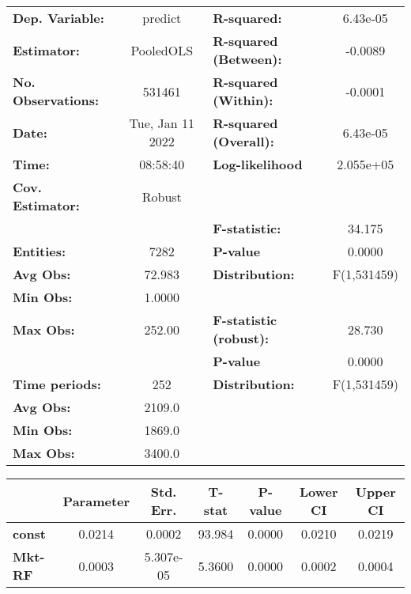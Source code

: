 \begin{center}
\begin{tabular}{lclc}
\toprule
\textbf{Dep. Variable:}    &      predict       & \textbf{  R-squared:         }   &     6.43e-05     \\
\textbf{Estimator:}        &     PooledOLS      & \textbf{  R-squared (Between):}  &     -0.0089      \\
\textbf{No. Observations:} &       531461       & \textbf{  R-squared (Within):}   &     -0.0001      \\
\textbf{Date:}             &  Tue, Jan 11 2022  & \textbf{  R-squared (Overall):}  &     6.43e-05     \\
\textbf{Time:}             &      08:58:40      & \textbf{  Log-likelihood     }   &    2.055e+05     \\
\textbf{Cov. Estimator:}   &       Robust       & \textbf{                     }   &                  \\
\textbf{}                  &                    & \textbf{  F-statistic:       }   &      34.175      \\
\textbf{Entities:}         &        7282        & \textbf{  P-value            }   &      0.0000      \\
\textbf{Avg Obs:}          &       72.983       & \textbf{  Distribution:      }   &   F(1,531459)    \\
\textbf{Min Obs:}          &       1.0000       & \textbf{                     }   &                  \\
\textbf{Max Obs:}          &       252.00       & \textbf{  F-statistic (robust):} &      28.730      \\
\textbf{}                  &                    & \textbf{  P-value            }   &      0.0000      \\
\textbf{Time periods:}     &        252         & \textbf{  Distribution:      }   &   F(1,531459)    \\
\textbf{Avg Obs:}          &       2109.0       & \textbf{                     }   &                  \\
\textbf{Min Obs:}          &       1869.0       & \textbf{                     }   &                  \\
\textbf{Max Obs:}          &       3400.0       & \textbf{                     }   &                  \\
\bottomrule
\end{tabular}
\begin{tabular}{lcccccc}
                & \textbf{Parameter} & \textbf{Std. Err.} & \textbf{T-stat} & \textbf{P-value} & \textbf{Lower CI} & \textbf{Upper CI}  \\
\midrule
\textbf{const}  &       0.0214       &       0.0002       &      93.984     &      0.0000      &       0.0210      &       0.0219       \\
\textbf{Mkt-RF} &       0.0003       &     5.307e-05      &      5.3600     &      0.0000      &       0.0002      &       0.0004       \\
\bottomrule
\end{tabular}
\end{center}
